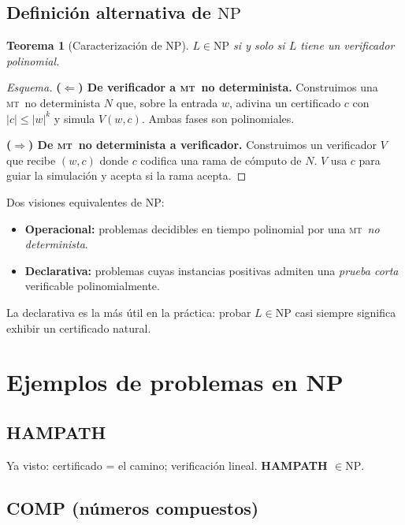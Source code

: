 \documentclass[11pt,a4paper]{article}
\theoremstyle{definicion}
\newtheorem{teorema}[definicion]{Teorema}
\newcommand{\MT}{\textsc{mt}}
\newcommand{\NP}{\mathrm{NP}}
\begin{document}
\subsection{Definici\'on alternativa de $\NP$}

\begin{teorema}[Caracterizaci\'on de $\NP$]
$L \in \NP$ si y solo si $L$ tiene un verificador polinomial.
\end{teorema}

\begin{proof}[Esquema]
\textbf{($\Leftarrow$) De verificador a \MT\ no determinista.} Construimos una \MT\ no determinista $N$ que, sobre la entrada $w$, adivina un certificado $c$ con $|c| \leq |w|^k$ y simula $V(w, c)$. Ambas fases son polinomiales.

\textbf{($\Rightarrow$) De \MT\ no determinista a verificador.} Construimos un verificador $V$ que recibe $(w, c)$ donde $c$ codifica una rama de c\'omputo de $N$. $V$ usa $c$ para guiar la simulaci\'on y acepta si la rama acepta.
\end{proof}

\begin{idea}
Dos visiones equivalentes de $\NP$:
\begin{itemize}
    \item \textbf{Operacional:} problemas decidibles en tiempo polinomial por una \MT\ \emph{no determinista}.
    \item \textbf{Declarativa:} problemas cuyas instancias positivas admiten una \emph{prueba corta} verificable polinomialmente.
\end{itemize}
La declarativa es la m\'as \'util en la pr\'actica: probar $L \in \NP$ casi siempre significa exhibir un certificado natural.
\end{idea}

\section{Ejemplos de problemas en NP}

\subsection{HAMPATH}

Ya visto: certificado = el camino; verificaci\'on lineal. \textbf{HAMPATH $\in \NP$}.

\subsection{COMP (n\'umeros compuestos)}
\end{document}
